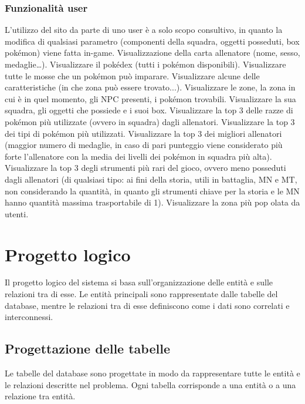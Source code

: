 \documentclass{article}
\begin{document}
\subsubsection{Funzionalità user}
L’utilizzo del sito da parte di uno user è a solo scopo consultivo, in quanto la modifica di qualsiasi parametro (componenti della squadra, oggetti posseduti, box pokémon) viene fatta in-game.
Visualizzazione della carta allenatore (nome, sesso, medaglie…).
Visualizzare il pokédex (tutti i pokémon disponibili).
Visualizzare tutte le mosse che un pokémon può imparare.
Visualizzare alcune delle caratteristiche (in che zona può essere trovato...).
Visualizzare le zone, la zona in cui è in quel momento, gli NPC presenti, i pokémon trovabili.
Visualizzare la sua squadra, gli oggetti che possiede e i suoi box.
Visualizzare la top 3 delle razze di pokémon più utilizzate (ovvero in squadra) dagli allenatori.
Visualizzare la top 3 dei tipi di pokémon più utilizzati.
Visualizzare la top 3 dei migliori allenatori (maggior numero di medaglie, in caso di pari punteggio viene considerato più forte l'allenatore con la media dei livelli dei pokémon in squadra più alta).
Visualizzare la top 3 degli strumenti più rari del gioco, ovvero meno posseduti dagli allenatori (di qualsiasi tipo: ai fini della storia, utili in battaglia, MN e MT, non considerando la quantità, in quanto gli strumenti chiave per la storia e le MN hanno quantità massima trasportabile di 1).
Visualizzare la zona più pop
olata da utenti.

\section{Progetto logico}

Il progetto logico del sistema si basa sull'organizzazione delle entità e sulle relazioni tra di esse. Le entità principali sono rappresentate dalle tabelle del database, mentre le relazioni tra di esse definiscono come i dati sono correlati e interconnessi.

\subsection{Progettazione delle tabelle}

Le tabelle del database sono progettate in modo da rappresentare tutte le entità e le relazioni descritte nel problema. Ogni tabella corrisponde a una entità o a una relazione tra entità.
\end{document}

